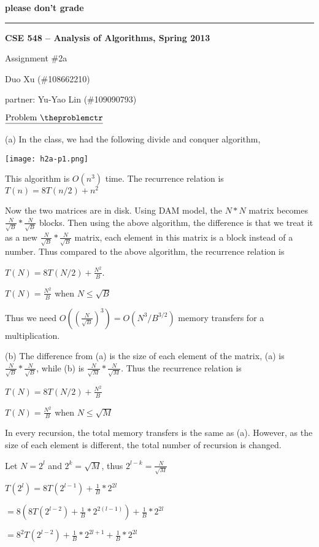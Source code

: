 \documentclass[11pt]{article}
\def\pp{\par\noindent}
\begin{document}
\centerline{\bf please don't grade}
\medskip
\hrule
\bigskip
\centerline{\bf CSE 548 -- Analysis of Algorithms, Spring 2013}
\medskip
\centerline{Assignment \#2a}
\medskip
\centerline{Duo Xu (\#108662210)}
\medskip
\centerline{partner: Yu-Yao Lin (\#109090793)}
\bigskip
\bigskip



\addtocounter{problemctr}{1}
\bigskip
\noindent
$\underline{\rm Problem\ \theproblemctr}$\pp

\noindent
(a) In the class, we had the following divide and conquer algorithm,

\medskip
\texttt{[image: h2a-p1.png]}

\medskip
This algorithm is $O(n^3)$ time. The recurrence relation is $T(n) = 8T(n/2)+n^2$

Now the two matrices are in disk. Using DAM model, the $N*N$ matrix becomes $\frac{N}{\sqrt{B}}*\frac{N}{\sqrt{B}}$ blocks. Then using the above algorithm, the difference is that we treat it as a new $\frac{N}{\sqrt{B}}*\frac{N}{\sqrt{B}}$ matrix, each element in this matrix is a block instead of a number. Thus compared to the above algorithm, the recurrence relation is 

$T(N) = 8T(N/2)+\frac{N^2}{B}$. 

$T(N) = \frac{N^2}{B}$ when $N \le \sqrt{B}$

Thus we need $O((\frac{N}{\sqrt{B}})^3) = O(N^3/B^{3/2})$ memory transfers for a multiplication.

\vfill
\newpage
\noindent
(b)  The difference from (a) is the size of each element of the matrix, (a) is $\frac{N}{\sqrt{B}}*\frac{N}{\sqrt{B}}$, while (b) is $\frac{N}{\sqrt{M}}*\frac{N}{\sqrt{M}}$. Thus the recurrence relation is 

$T(N) = 8T(N/2)+\frac{N^2}{B}$

$T(N) = \frac{N^2}{B}$ when $N \le \sqrt{M}$

In every recursion, the total memory transfers is the same as (a). However, as the size of each element is different, the total number of recursion is changed.

Let $N = 2^l$ and $2^k = \sqrt{M}$, thus $2^{l-k} = \frac{N}{\sqrt{M}}$

$T(2^l) = 8T(2^{l-1})+\frac{1}{B}*2^{2l}$ 

\hspace{1.0 cm}$= 8(8T(2^{l-2})+\frac{1}{B}*2^{2(l-1)})+\frac{1}{B}*2^{2l}$

\hspace{1.0 cm}$= 8^{2}T(2^{l-2})+\frac{1}{B}*2^{2l+1}+\frac{1}{B}*2^{2l}$
\end{document}
